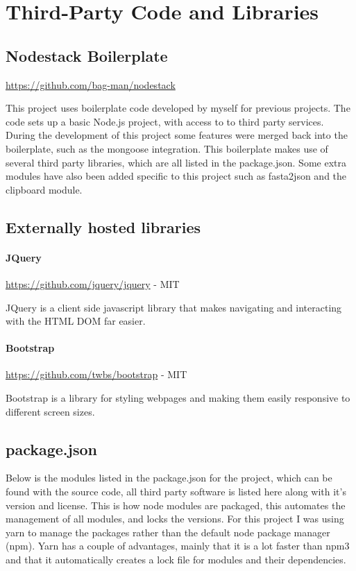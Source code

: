 \chapter{Third-Party Code and Libraries}
\section{Nodestack Boilerplate}

\url{https://github.com/bag-man/nodestack}

This project uses boilerplate code developed by myself for previous projects. The code sets up a basic Node.js project, with access to to third party services. During the development of this project some features were merged back into the boilerplate, such as the mongoose integration.  This boilerplate makes use of several third party libraries, which are all listed in the package.json. Some extra modules have also been added specific to this project such as fasta2json and the clipboard module. 

\section{Externally hosted libraries}
\subsubsection*{JQuery} 

\url{https://github.com/jquery/jquery} - MIT

JQuery is a client side javascript library that makes navigating and interacting with the HTML DOM far easier. 

\subsubsection*{Bootstrap} 

\url{https://github.com/twbs/bootstrap} - MIT

Bootstrap is a library for styling webpages and making them easily responsive to different screen sizes.

\section{package.json}
Below is the modules listed in the package.json for the project, which can be found with the source code, all third party software is listed here along with it's version and license. This is how node modules are packaged, this automates the management of all modules, and locks the versions. For this project I was using yarn\cite{yarn} to manage the packages rather than the default node package manager (npm)\cite{npm}. Yarn has a couple of advantages, mainly that it is a lot faster than npm3 and that it automatically creates a lock file for modules and their dependencies. 

